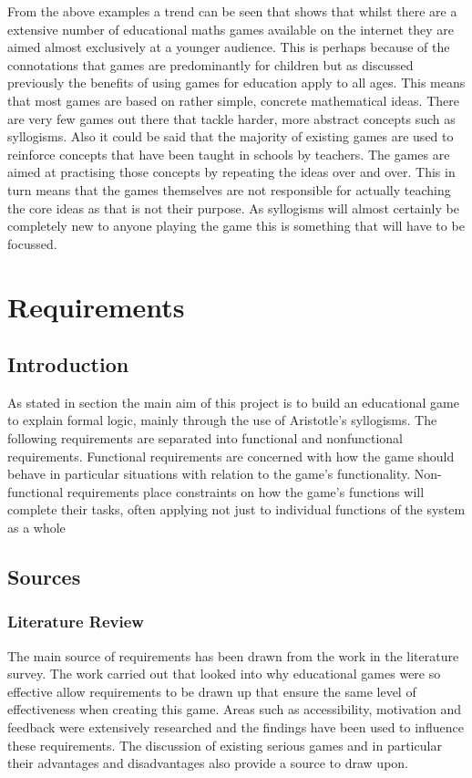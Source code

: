 \documentclass[12pt,a4paper]{report}
\begin{document}
From the above examples a trend can be seen that shows that whilst there are a extensive number of educational maths games available on the internet they are aimed almost exclusively at a younger audience. This is perhaps because of the connotations that games are predominantly for children but as discussed previously the benefits of using games for education apply to all ages. This means that most games are based on rather simple, concrete mathematical ideas. There are very few games out there that tackle harder, more abstract concepts such as syllogisms. Also it could be said that the majority of existing games are used to reinforce concepts that have been taught in schools by teachers. The games are aimed at practising those concepts by repeating the ideas over and over. This in turn means that the games themselves are not responsible for actually teaching the core ideas as that is not their purpose. As syllogisms will almost certainly be completely new to anyone playing the game this is something that will have to be focussed.


\chapter{Requirements}
\section{Introduction}
As stated in section the main aim of this project is to build an educational game to explain formal logic, mainly through the use of Aristotle's syllogisms. The following requirements are separated into functional and nonfunctional requirements. Functional requirements are concerned with how the game should behave in particular situations with relation to the game's functionality. 
Non-functional requirements place constraints on how the game's functions will complete their tasks, often applying not just to individual functions of the system as a whole

\section{Sources}
\subsection{Literature Review}
The main source of requirements has been drawn from the work in the literature survey. The work carried out that looked into why educational games were so effective allow requirements to be drawn up that ensure the same level of effectiveness when creating this game. Areas such as accessibility, motivation and feedback were extensively researched and the findings have been used to influence these requirements. The discussion of existing serious games and in particular their advantages and disadvantages also provide a source to draw upon.
\end{document}
